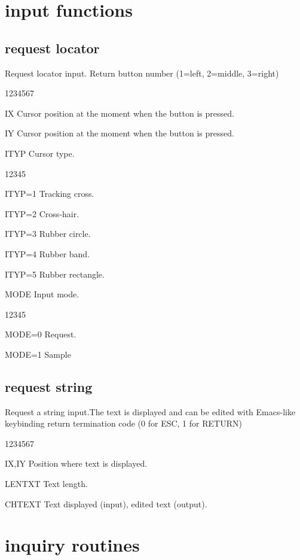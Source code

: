 \section{ input functions}
\subsection{ request locator}
%
\Action
Request locator input.
Return button number (1=left, 2=middle, 3=right)
\Pdesc
\begin{DLtt}{1234567}
\item[IX] Cursor position at the moment when the button is pressed.
\item[IY] Cursor position at the moment when the button is pressed.
\item[ITYP] Cursor type.
\begin{DLtt}{12345}
\item[ITYP=1] Tracking cross.
\item[ITYP=2] Cross-hair.
\item[ITYP=3] Rubber circle.
\item[ITYP=4] Rubber band.
\item[ITYP=5] Rubber rectangle.
\end{DLtt}
\item[MODE] Input mode.
\begin{DLtt}{12345}
\item[MODE=0] Request.
\item[MODE=1] Sample
\end{DLtt}
\end{DLtt}
\subsection{ request string}
%
\Action
Request a string input.The text is displayed and can be edited with
Emacs-like keybinding
return termination code (0 for ESC, 1 for RETURN)
\Pdesc
\begin{DLtt}{1234567}
\item[IX,IY] Position where text is displayed.
\item[LENTXT] Text length.
\item[CHTEXT] Text displayed (input), edited text (output).
\end{DLtt}

\section{ inquiry routines}
